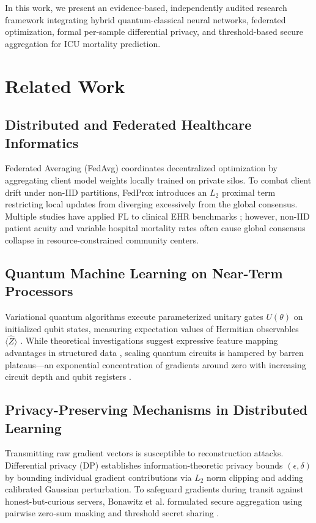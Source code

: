 \documentclass[conference]{IEEEtran}
\begin{document}
In this work, we present an evidence-based, independently audited research framework integrating hybrid quantum-classical neural networks, federated optimization, formal per-sample differential privacy, and threshold-based secure aggregation for ICU mortality prediction.

\section{Related Work}
\subsection{Distributed and Federated Healthcare Informatics}
Federated Averaging (FedAvg) \cite{mcmahan2017communication} coordinates decentralized optimization by aggregating client model weights locally trained on private silos. To combat client drift under non-IID partitions, FedProx \cite{li2020federated} introduces an $L_2$ proximal term restricting local updates from diverging excessively from the global consensus. Multiple studies have applied FL to clinical EHR benchmarks \cite{rieke2020future}; however, non-IID patient acuity and variable hospital mortality rates often cause global consensus collapse in resource-constrained community centers.

\subsection{Quantum Machine Learning on Near-Term Processors}
Variational quantum algorithms execute parameterized unitary gates $U(\theta)$ on initialized qubit states, measuring expectation values of Hermitian observables $\langle \hat{Z} \rangle$ \cite{cerezo2021variational, bergholm2018pennylane}. While theoretical investigations suggest expressive feature mapping advantages in structured data \cite{huang2021quantum}, scaling quantum circuits is hampered by barren plateaus---an exponential concentration of gradients around zero with increasing circuit depth and qubit registers \cite{mcclean2018barren}.

\subsection{Privacy-Preserving Mechanisms in Distributed Learning}
Transmitting raw gradient vectors is susceptible to reconstruction attacks. Differential privacy (DP) \cite{dwork2014algorithmic, abadi2016deep} establishes information-theoretic privacy bounds $(\epsilon, \delta)$ by bounding individual gradient contributions via $L_2$ norm clipping and adding calibrated Gaussian perturbation. To safeguard gradients during transit against honest-but-curious servers, Bonawitz et al. \cite{bonawitz2017practical} formulated secure aggregation using pairwise zero-sum masking and threshold secret sharing \cite{shamir1979share}.
\end{document}

